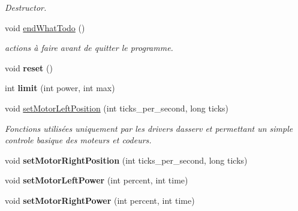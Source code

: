 \begin{DoxyCompactItemize}
\begin{DoxyCompactList}\small\item\em Destructor. \end{DoxyCompactList}\item 
\mbox{\label{classAsservDriver_a636bf5413d2cf0419f188a4965340758}} 
void \hyperlink{classAsservDriver_a636bf5413d2cf0419f188a4965340758}{end\+What\+Todo} ()
\begin{DoxyCompactList}\small\item\em actions à faire avant de quitter le programme. \end{DoxyCompactList}\item 
\mbox{\label{classAsservDriver_af36a7173937151f268540614cddcd641}} 
void {\bfseries reset} ()
\item 
\mbox{\label{classAsservDriver_a97a107b23d634ed1a800a0ede7161baf}} 
int {\bfseries limit} (int power, int max)
\item 
\mbox{\label{classAsservDriver_a06e66d6e5607c2268174b0c1aa0a4c77}} 
void \hyperlink{classAsservDriver_a06e66d6e5607c2268174b0c1aa0a4c77}{set\+Motor\+Left\+Position} (int ticks\+\_\+per\+\_\+second, long ticks)
\begin{DoxyCompactList}\small\item\em Fonctions utilisées uniquement par les drivers d\textquotesingle{}asserv et permettant un simple controle basique des moteurs et codeurs. \end{DoxyCompactList}\item 
\mbox{\label{classAsservDriver_ac8e1e6be69102f2bad8b0a599c61b155}} 
void {\bfseries set\+Motor\+Right\+Position} (int ticks\+\_\+per\+\_\+second, long ticks)
\item 
\mbox{\label{classAsservDriver_adf3b38a6392b2b46094cd22209a67111}} 
void {\bfseries set\+Motor\+Left\+Power} (int percent, int time)
\item 
\mbox{\label{classAsservDriver_a7bb525dfc34c7b0d94e5ccd6b38f49f8}} 
void {\bfseries set\+Motor\+Right\+Power} (int percent, int time)
\item 
\mbox{\label{classAsservDriver_aa6924c9da7428d59fa712c15221dfbac}} 

\end{DoxyCompactItemize}
